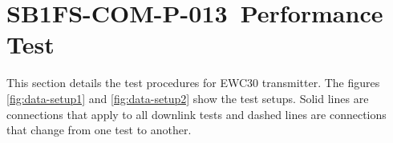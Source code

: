 

\renewcommand{\reqid}{N/A}
\renewcommand{\procid}{SB1FS-COM-P-013}
\renewcommand{\procname}{Performance Test\xspace}

\section{\procid \ \procname} \label{sec:SB1FS-COM-P-013}


 This section details the test procedures for EWC30 transmitter.
 The figures \ref{fig:data-setup1} and  \ref{fig:data-setup2} show the test setups.
 Solid lines are connections that apply to all downlink tests and dashed 
 lines are connections that change from one test to another.


		



